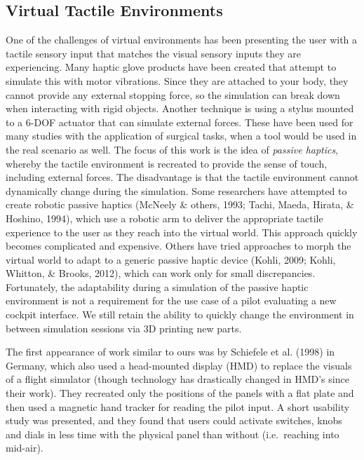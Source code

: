 \subsection{Virtual Tactile Environments}
\label{virtual-tactile-environments}

One of the challenges of virtual environments has been presenting the user with a tactile sensory input that matches the visual sensory inputs they are experiencing.
Many haptic glove products have been created that attempt to simulate this with motor vibrations.
Since they are attached to your body, they cannot provide any external stopping force, so the simulation can break down when interacting with rigid objects.
Another technique is using a stylus mounted to a 6-DOF actuator that can simulate external forces.
These have been used for many studies with the application of surgical tasks, when a tool would be used in the real scenario as well.
The focus of this work is the idea of \emph{passive haptics}, whereby the tactile environment is recreated to provide the sense of touch, including external forces.
 The disadvantage is that the tactile environment cannot dynamically change during the simulation.
Some researchers have attempted to create robotic passive haptics (McNeely \& others, 1993; Tachi, Maeda, Hirata, \& Hoshino, 1994), which use a robotic arm to deliver the appropriate tactile experience to the user as they reach into the virtual world.
This approach quickly becomes complicated and expensive.
Others have tried approaches to morph the virtual world to adapt to a generic passive haptic device (Kohli, 2009; Kohli, Whitton, \& Brooks, 2012), which can work only for small discrepancies.
Fortunately, the adaptability during a simulation of the passive haptic environment is not a requirement for the use case of a pilot evaluating a new cockpit interface.
We still retain the ability to quickly change the environment in between simulation sessions via 3D printing new parts.

The first appearance of work similar to ours was by Schiefele et al.  (1998) in Germany, which also used a head-mounted display (HMD) to replace the visuals of a flight simulator (though technology has drastically changed in HMD's since their work).
They recreated only the positions of the panels with a flat plate and then used a magnetic hand tracker for reading the pilot input.
A short usability study was presented, and they found that users could activate switches, knobs and dials in less time with the physical panel than without (i.e.\ reaching into mid-air).

